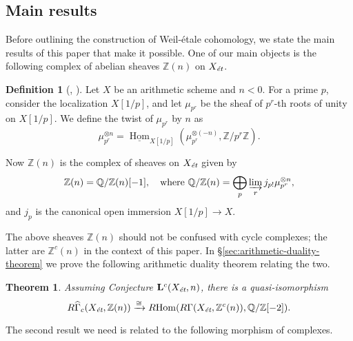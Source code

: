 \documentclass[leqno,12pt]{article}
\theoremstyle{plain}
\newtheorem{maintheorem}{Theorem}
\theoremstyle{definition}
\newtheorem{definition}[theorem]{\indent\sc Definition}
\DeclareMathOperator{\Hom}{Hom}
\newcommand{\QQ}{\mathbb{Q}}
\newcommand{\ZZ}{\mathbb{Z}}
\newcommand{\et}{\text{\it \'{e}t}}
\newcommand{\iHom}{\underline{\Hom}}
\newcommand{\RHom}{R\!\Hom}
\begin{document}
\subsection*{Main results}

Before outlining the construction of Weil-\'{e}tale cohomology, we state the
main results of this paper that make it possible. One of our main objects is the
following complex of abelian sheaves $\ZZ (n)$ on $X_\et$.

\begin{definition}[{\cite[\S 3.1]{Flach-Morin-2018}}, {\cite[\S 7]{Geisser-2004}}]
  \label{dfn:sheaf-Z(n)}
  Let $X$ be an arithmetic scheme and $n < 0$. For a prime $p$, consider
  the localization $X [1/p]$, and let $\mu_{p^r}$ be the sheaf of $p^r$-th
  roots of unity on $X [1/p]$. We define the twist of $\mu_{p^r}$ by $n$
  as
  $$\mu_{p^r}^{\otimes n} = \iHom_{X[1/p]} (\mu_{p^r}^{\otimes (-n)}, \ZZ/p^r\ZZ).$$

  Now $\ZZ (n)$ is the complex of sheaves on $X_\et$ given by
  \[ \ZZ (n) = \QQ/\ZZ (n) [-1],
  \quad \text{where }
  \QQ/\ZZ (n) = \bigoplus_p \varinjlim_r j_{p!} \mu_{p^r}^{\otimes n}, \]
  and $j_p$ is the canonical open immersion $X[1/p] \to X$.
\end{definition}

The above sheaves $\ZZ (n)$ should not be confused with cycle complexes;
the latter are $\ZZ^c (n)$ in the context of this paper.
In \S\ref{sec:arithmetic-duality-theorem} we prove the following arithmetic
duality theorem relating the two.

\begin{maintheorem}
  \label{theorem-I}
  Assuming Conjecture $\mathbf{L}^c (X_\et,n)$, there is a quasi-isomorphism
  \[ R\widehat{\Gamma}_c (X_\et, \ZZ (n)) \xrightarrow{\cong}
    \RHom (R\Gamma (X_\et, \ZZ^c (n)), \QQ/\ZZ [-2]). \]
\end{maintheorem}

The second result we need is related to the following morphism of complexes.
\end{document}

